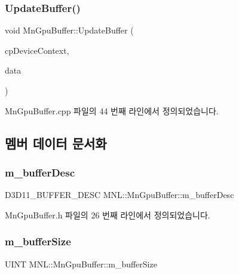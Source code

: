 \subsubsection{\texorpdfstring{Update\+Buffer()}{UpdateBuffer()}}
{\footnotesize\ttfamily void Mn\+Gpu\+Buffer\+::\+Update\+Buffer (\begin{DoxyParamCaption}\item[{\hyperlink{namespace_m_n_l_aab3aabb6c9360e44ddc8b0bb563c2107}{C\+P\+D3\+D\+Device\+Context}}]{cp\+Device\+Context,  }\item[{const D3\+D11\+\_\+\+S\+U\+B\+R\+E\+S\+O\+U\+R\+C\+E\+\_\+\+D\+A\+TA \&}]{data }\end{DoxyParamCaption})}



Mn\+Gpu\+Buffer.\+cpp 파일의 44 번째 라인에서 정의되었습니다.



\subsection{멤버 데이터 문서화}
\mbox{\label{class_m_n_l_1_1_mn_gpu_buffer_ac37d75136ddee08ebf61d2d188dd4b01}} 
\subsubsection{\texorpdfstring{m\+\_\+buffer\+Desc}{m\_bufferDesc}}
{\footnotesize\ttfamily D3\+D11\+\_\+\+B\+U\+F\+F\+E\+R\+\_\+\+D\+E\+SC M\+N\+L\+::\+Mn\+Gpu\+Buffer\+::m\+\_\+buffer\+Desc\hspace{0.3cm}{\ttfamily [protected]}}



Mn\+Gpu\+Buffer.\+h 파일의 26 번째 라인에서 정의되었습니다.

\mbox{\label{class_m_n_l_1_1_mn_gpu_buffer_a275688eb205f74155a813a1ba65e149f}} 
\subsubsection{\texorpdfstring{m\+\_\+buffer\+Size}{m\_bufferSize}}
{\footnotesize\ttfamily U\+I\+NT M\+N\+L\+::\+Mn\+Gpu\+Buffer\+::m\+\_\+buffer\+Size\hspace{0.3cm}{\ttfamily [protected]}}



